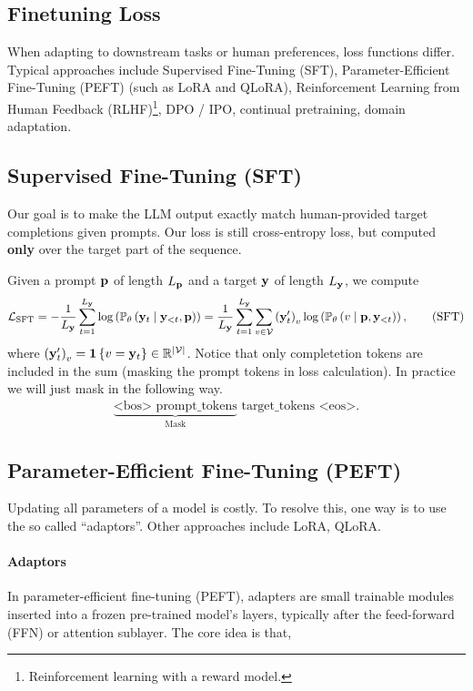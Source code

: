 \documentclass[11pt]{article}  %
\begin{document}
\subsection{Finetuning Loss}
When adapting to downstream tasks or human preferences, loss functions differ.
Typical approaches include Supervised Fine-Tuning (SFT), Parameter-Efficient Fine-Tuning (PEFT) (such as LoRA and QLoRA), Reinforcement Learning from Human Feedback (RLHF)\footnote{Reinforcement learning with a reward model.}, DPO / IPO, continual pretraining, domain adaptation.


\subsection{Supervised Fine-Tuning (SFT)}
Our goal is to make the LLM output exactly match human-provided target completions given prompts.
Our loss is still cross-entropy loss, but computed \textbf{only} over the target part of the sequence.

Given a prompt $\mathbf{p}$ of length $L_{\mathbf{p}}$ and a target $\mathbf{y}$ of length $L_{\mathbf{y}}$, we compute 
\begin{align}
  \mathcal{L}_{\text{SFT}} = -\frac{1}{L_{\mathbf{y}}} \sum_{t=1}^{L_{\mathbf{y}}} \log \left( \mathbb{P}_{\theta}\left( \mathbf{y}_t \mid \mathbf{y}_{< t}, \mathbf{p} \right) \right) = \frac{1}{L_{\mathbf{y}}}\sum_{t=1}^{L_{\mathbf{y}}}\sum_{v \in \mathcal{V}}\left( \mathbf{y}^\prime_t \right)_v\log\left( \mathbb{P}_{\theta}\left( v \mid \mathbf{p}, \mathbf{y}_{< t} \right) \right), \tag{SFT}
\end{align}
where $\left( \mathbf{y}^\prime_t \right)_v = \mathbf{1}\left\{ v = \mathbf{y}_t \right\} \in \mathbb{R}^{\lvert\mathcal{V}\rvert}$.
Notice that only completetion tokens are included in the sum (masking the prompt tokens in loss calculation).
In practice we will just mask in the following way.
\begin{align*}
  \underbrace{\text{<bos>  } \text{prompt\_tokens}}_{\text{Mask}} \text{ target\_tokens } \text{<eos>}. 
\end{align*}




\subsection{Parameter-Efficient Fine-Tuning (PEFT)}  Updating all parameters of a model is costly. 
To resolve this, one way is to use the so called ``adaptors''.
Other approaches include LoRA, QLoRA.

\paragraph{Adaptors} In parameter-efficient fine-tuning (PEFT), adapters are small trainable modules inserted into a frozen pre-trained model's layers, typically after the feed-forward (FFN) or attention sublayer.
The core idea is that, 
\end{document}
